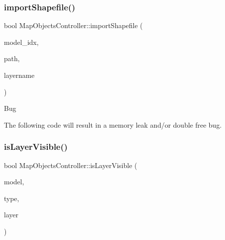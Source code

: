\mbox{\label{class_map_objects_controller_a98ea309344d8fa1f9529acbc8362b0a2}} 
\subsubsection{\texorpdfstring{importShapefile()}{importShapefile()}}
{\footnotesize\ttfamily bool Map\+Objects\+Controller\+::import\+Shapefile (\begin{DoxyParamCaption}\item[{int}]{model\+\_\+idx,  }\item[{Q\+String}]{path,  }\item[{Q\+String}]{layername }\end{DoxyParamCaption})}

\begin{DoxyRefDesc}{Bug}
\item[\mbox{\hyperlink{bug__bug000001}{Bug}}]The following code will result in a memory leak and/or double free bug. \end{DoxyRefDesc}
\mbox{\label{class_map_objects_controller_a43e7f38c765425568a1ab4538c06c873}} 
\subsubsection{\texorpdfstring{isLayerVisible()}{isLayerVisible()}}
{\footnotesize\ttfamily bool Map\+Objects\+Controller\+::is\+Layer\+Visible (\begin{DoxyParamCaption}\item[{int}]{model,  }\item[{\mbox{\hyperlink{class_object_tree_model_a379e9d6b0d381853785adf62095ba4e3}{Object\+Tree\+Model\+::\+Category}}}]{type,  }\item[{int}]{layer }\end{DoxyParamCaption})}

\mbox{\label{class_map_objects_controller_a96ec035b0d07fe169a98476a0e8de8d0}} 
